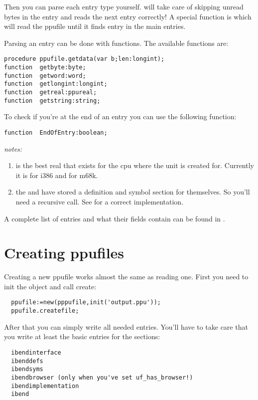 Then you can parse each entry type yourself.  will take
care of skipping unread bytes in the entry and reads the next entry
correctly! A special function is 
which will read the ppufile until it finds entry  in the main
entries.

Parsing an entry can be done with  functions. The
available functions are:
\begin{verbatim}
procedure ppufile.getdata(var b;len:longint);
function  getbyte:byte;
function  getword:word;
function  getlongint:longint;
function  getreal:ppureal;
function  getstring:string;
\end{verbatim}

To check if you're at the end of an entry you can use the following
function:

\begin{verbatim}
function  EndOfEntry:boolean;
\end{verbatim}
{\em notes:}
\begin{enumerate}
\item {} is the best real that exists for the cpu where the
unit is created for. Currently it is  for i386 and
 for m68k.
\item the  and  have stored a definition
and symbol section for themselves. So you'll need a recursive call. See
 for a correct implementation.
\end{enumerate}

A complete list of entries and what their fields contain can be found
in .

\section{Creating ppufiles}
Creating a new ppufile works almost the same as reading one.
First you need to init the object and call create:
\begin{verbatim}
  ppufile:=new(pppufile,init('output.ppu'));
  ppufile.createfile;
\end{verbatim}

After that you can simply write all needed entries. You'll have to take
care that you write at least the basic entries for the sections:
\begin{verbatim}
  ibendinterface
  ibenddefs
  ibendsyms
  ibendbrowser (only when you've set uf_has_browser!)
  ibendimplementation
  ibend
\end{verbatim}


